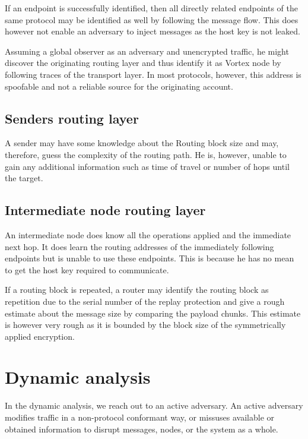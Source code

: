 If an endpoint is successfully identified, then all directly related endpoints of the same protocol may be identified as well by following the message flow. This does however not enable an adversary to inject messages as the host key is not leaked. 

Assuming a global observer as an adversary and unencrypted traffic, he might discover the originating routing layer and thus identify it as Vortex node by following traces of the transport layer. In most protocols, however, this address is spoofable and not a reliable source for the originating account.

\section{Senders routing layer}
A sender may have some knowledge about the Routing block size and may, therefore, guess the complexity of the routing path. He is, however, unable to gain any additional information such as time of travel or number of hops until the target.

\section{Intermediate node routing layer}
An intermediate node does know all the operations applied and the immediate next hop. It does learn the routing addresses of the immediately following endpoints but is unable to use these endpoints. This is because he has no mean to get the host key required to communicate.

If a routing block is repeated, a router may identify the routing block as repetition due to the serial number of the replay protection and give a rough estimate about the message size by comparing the payload chunks. This estimate is however very rough as it is bounded by the block size of the symmetrically applied encryption.

\chapter{Dynamic analysis}
In the dynamic analysis, we reach out to an active adversary. An active adversary modifies traffic in a non-protocol conformant way, or missuses available or obtained information to disrupt messages, nodes, or the system as a whole.

